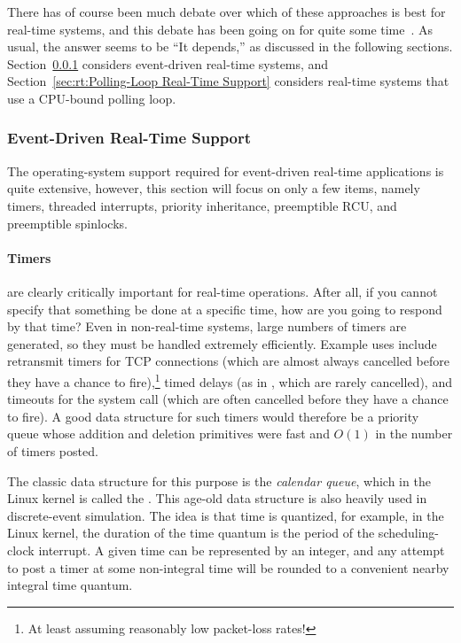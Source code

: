 There has of course been much debate over which of these approaches
is best for real-time systems, and this debate has been going on for
quite some
time~\cite{JonCorbet2004RealTimeLinuxPart1,JonCorbet2004RealTimeLinuxPart2}.
As usual, the answer seems to be ``It depends,'' as discussed in the
following sections.
Section~\ref{sec:rt:Event-Driven Real-Time Support}
considers event-driven real-time systems, and
Section~\ref{sec:rt:Polling-Loop Real-Time Support}
considers real-time systems that use a CPU-bound polling loop.

\subsubsection{Event-Driven Real-Time Support}
\label{sec:rt:Event-Driven Real-Time Support}

The operating-system support required for event-driven real-time
applications is quite extensive, however, this section will focus
on only a few items, namely
timers,
threaded interrupts,
priority inheritance,
preemptible RCU,
and
preemptible spinlocks.

\paragraph{Timers} are clearly critically important for real-time
operations.
After all, if you cannot specify that something be done at a specific
time, how are you going to respond by that time?
Even in non-real-time systems, large numbers of timers are generated,
so they must be handled extremely efficiently.
Example uses include retransmit timers for TCP connections (which are
almost always cancelled before they have a chance to fire),\footnote{
	At least assuming reasonably low packet-loss rates!}
timed delays (as in , which are rarely cancelled),
and timeouts for the  system call (which are often
cancelled before they have a chance to fire).
A good data structure for such timers would therefore be a priority queue
whose addition and deletion primitives were fast and $O(1)$ in the number
of timers posted.

The classic data structure for this purpose is the \emph{calendar queue},
which in the Linux kernel is called the .
This age-old data structure is also heavily used in discrete-event
simulation.
The idea is that time is quantized, for example, in the Linux kernel,
the duration of the time quantum is the period of the scheduling-clock
interrupt.
A given time can be represented by an integer, and any attempt to post
a timer at some non-integral time will be rounded to a convenient nearby
integral time quantum.

